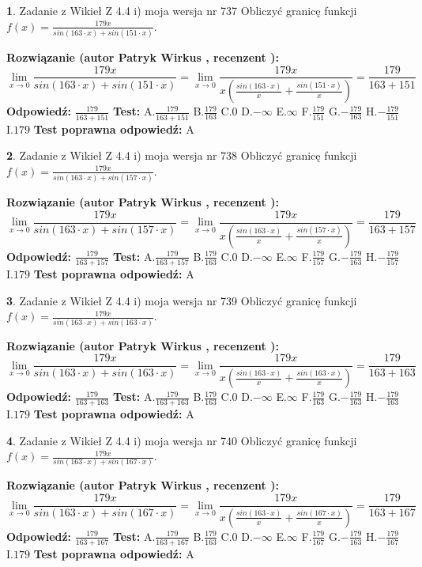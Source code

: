 \documentclass[12pt, a4paper]{article}
\theoremstyle{definition} %
\newtheorem{zad}{}
\newcommand{\zadStart}[1]{\begin{zad}#1\newline}
\newcommand{\zadStop}{\end{zad}}
\newcommand{\rozwStart}[2]{\noindent \textbf{Rozwiązanie (autor #1 , recenzent #2): }\newline}
\newcommand{\rozwStop}{\newline}
\newcommand{\odpStart}{\noindent \textbf{Odpowiedź:}\newline}
\newcommand{\odpStop}{\newline}
\newcommand{\testStart}{\noindent \textbf{Test:}\newline}
\newcommand{\testStop}{\newline}
\newcommand{\kluczStart}{\noindent \textbf{Test poprawna odpowiedź:}\newline}
\newcommand{\kluczStop}{\newline}
\begin{document}
\zadStart{Zadanie z Wikieł Z 4.4 i) moja wersja nr 737}
Obliczyć granicę funkcji $f(x)=\frac{179x}{sin(163\cdot x) +sin(151\cdot x)}$.
\zadStop
\rozwStart{Patryk Wirkus}{}
$$\lim\limits_{x\to 0}\frac{179x}{sin(163\cdot x) +sin(151\cdot x)}=\lim\limits_{x\to 0}\frac{179x}{x(\frac{sin(163\cdot x)}{x}+\frac{sin(151\cdot x)}{x})}=\frac{179}{163+151}$$
\rozwStop
\odpStart
$\frac{179}{163+151}$
\odpStop
\testStart
A.$\frac{179}{163+151}$
B.$\frac{179}{163}$
C.$0$
D.$-\infty$
E.$\infty$
F.$\frac{179}{151}$
G.$-\frac{179}{163}$
H.$-\frac{179}{151}$
I.$179$
\testStop
\kluczStart
A
\kluczStop



\zadStart{Zadanie z Wikieł Z 4.4 i) moja wersja nr 738}
Obliczyć granicę funkcji $f(x)=\frac{179x}{sin(163\cdot x) +sin(157\cdot x)}$.
\zadStop
\rozwStart{Patryk Wirkus}{}
$$\lim\limits_{x\to 0}\frac{179x}{sin(163\cdot x) +sin(157\cdot x)}=\lim\limits_{x\to 0}\frac{179x}{x(\frac{sin(163\cdot x)}{x}+\frac{sin(157\cdot x)}{x})}=\frac{179}{163+157}$$
\rozwStop
\odpStart
$\frac{179}{163+157}$
\odpStop
\testStart
A.$\frac{179}{163+157}$
B.$\frac{179}{163}$
C.$0$
D.$-\infty$
E.$\infty$
F.$\frac{179}{157}$
G.$-\frac{179}{163}$
H.$-\frac{179}{157}$
I.$179$
\testStop
\kluczStart
A
\kluczStop



\zadStart{Zadanie z Wikieł Z 4.4 i) moja wersja nr 739}
Obliczyć granicę funkcji $f(x)=\frac{179x}{sin(163\cdot x) +sin(163\cdot x)}$.
\zadStop
\rozwStart{Patryk Wirkus}{}
$$\lim\limits_{x\to 0}\frac{179x}{sin(163\cdot x) +sin(163\cdot x)}=\lim\limits_{x\to 0}\frac{179x}{x(\frac{sin(163\cdot x)}{x}+\frac{sin(163\cdot x)}{x})}=\frac{179}{163+163}$$
\rozwStop
\odpStart
$\frac{179}{163+163}$
\odpStop
\testStart
A.$\frac{179}{163+163}$
B.$\frac{179}{163}$
C.$0$
D.$-\infty$
E.$\infty$
F.$\frac{179}{163}$
G.$-\frac{179}{163}$
H.$-\frac{179}{163}$
I.$179$
\testStop
\kluczStart
A
\kluczStop



\zadStart{Zadanie z Wikieł Z 4.4 i) moja wersja nr 740}
Obliczyć granicę funkcji $f(x)=\frac{179x}{sin(163\cdot x) +sin(167\cdot x)}$.
\zadStop
\rozwStart{Patryk Wirkus}{}
$$\lim\limits_{x\to 0}\frac{179x}{sin(163\cdot x) +sin(167\cdot x)}=\lim\limits_{x\to 0}\frac{179x}{x(\frac{sin(163\cdot x)}{x}+\frac{sin(167\cdot x)}{x})}=\frac{179}{163+167}$$
\rozwStop
\odpStart
$\frac{179}{163+167}$
\odpStop
\testStart
A.$\frac{179}{163+167}$
B.$\frac{179}{163}$
C.$0$
D.$-\infty$
E.$\infty$
F.$\frac{179}{167}$
G.$-\frac{179}{163}$
H.$-\frac{179}{167}$
I.$179$
\testStop
\kluczStart
A
\kluczStop
\end{document}
